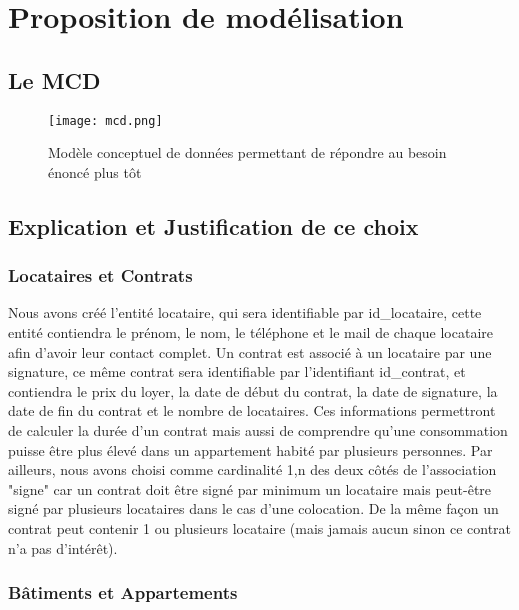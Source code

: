 \chapter{Proposition de modélisation}

\section{Le MCD}

\begin{figure}[!h]
\begin{center}
\texttt{[image: mcd.png]}
\end{center}
\caption{Modèle conceptuel de données permettant de répondre au besoin énoncé plus tôt}
\end{figure}

\section{Explication et Justification de ce choix}

\subsection{Locataires et Contrats}

Nous avons créé l’entité locataire, qui sera identifiable par id\_locataire, cette entité contiendra le prénom, le nom, le téléphone et le mail de chaque locataire afin d’avoir leur contact complet. Un contrat est associé à un locataire par une signature, ce même contrat sera identifiable par l’identifiant id\_contrat, et contiendra le prix du loyer, la date de début du contrat, la date de signature, la date de fin du contrat et le nombre de locataires. Ces informations permettront de calculer la durée d’un contrat mais aussi de comprendre qu'une consommation puisse être plus élevé dans un appartement habité par plusieurs personnes. Par ailleurs, nous avons choisi comme cardinalité 1,n des deux côtés de l'association "signe" car un contrat doit être signé par minimum un locataire mais peut-être signé par plusieurs locataires dans le cas d'une colocation. De la même façon un contrat peut contenir 1 ou plusieurs locataire (mais jamais aucun sinon ce contrat n'a pas d'intérêt).

\subsection{Bâtiments et Appartements}

